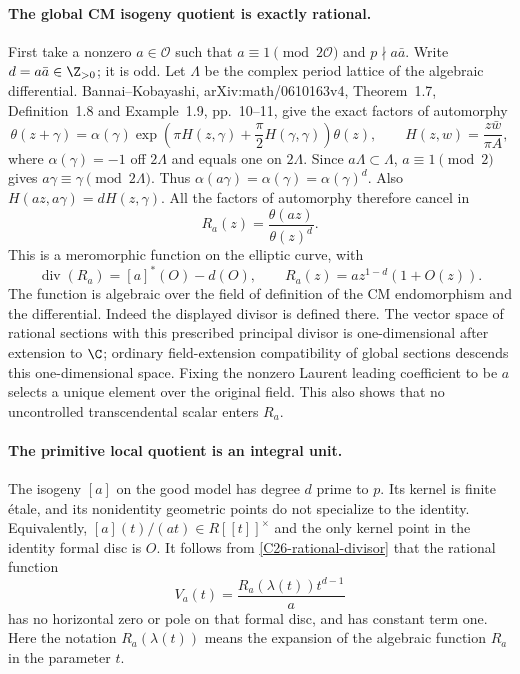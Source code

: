 \paragraph{The global CM isogeny quotient is exactly rational.}
First take a nonzero $a\in\mathcal O$ such that
$a\equiv1\pmod{2\mathcal O}$ and $p\nmid a\bar a$.
Write $d=a\bar a\in\Z_{>0}$; it is odd.
Let $\Lambda$ be the complex period lattice of the algebraic
differential.  Bannai--Kobayashi, arXiv:math/0610163v4,
Theorem~1.7, Definition~1.8 and Example~1.9, pp.~10--11,
give the exact factors of automorphy
\[
 \theta(z+\gamma)
 =\alpha(\gamma)
   \exp\!\left(\pi H(z,\gamma)+\frac\pi2H(\gamma,\gamma)\right)
   \theta(z),\qquad
 H(z,w)=\frac{z\bar w}{\pi A},
\]
where $\alpha(\gamma)=-1$ off $2\Lambda$ and equals one on
$2\Lambda$.  Since $a\Lambda\subset\Lambda$,
$a\equiv1\pmod2$ gives $a\gamma\equiv\gamma\pmod{2\Lambda}$.
Thus $\alpha(a\gamma)=\alpha(\gamma)=\alpha(\gamma)^d$.
Also $H(az,a\gamma)=dH(z,\gamma)$.
All the factors of automorphy therefore cancel in
\[
                 R_a(z)=\frac{\theta(az)}{\theta(z)^d}.
\]
This is a meromorphic function on the elliptic curve, with
\begin{equation}\label{C26-rational-divisor}
       \operatorname{div}(R_a)=[a]^*(O)-d(O),
       \qquad R_a(z)=a z^{1-d}(1+O(z)).
\end{equation}
The function is algebraic over the field of definition of the
CM endomorphism and the differential.  Indeed the displayed
divisor is defined there.  The vector space of rational sections
with this prescribed principal divisor is one-dimensional after
extension to $\C$; ordinary field-extension compatibility of
global sections descends this one-dimensional space.  Fixing the
nonzero Laurent leading coefficient to be $a$ selects a unique
element over the original field.  This also shows that no
uncontrolled transcendental scalar enters $R_a$.

\paragraph{The primitive local quotient is an integral unit.}
The isogeny $[a]$ on the good model has degree $d$ prime to $p$.
Its kernel is finite \'etale, and its nonidentity geometric
points do not specialize to the identity.  Equivalently,
$[a](t)/(a t)\in R[[t]]^{\times}$ and the only kernel point
in the identity formal disc is $O$.
It follows from \eqref{C26-rational-divisor} that the rational
function
\[
              V_a(t)=\frac{R_a(\lambda(t))t^{d-1}}a
\]
has no horizontal zero or pole on that formal disc, and has
constant term one.  Here the notation $R_a(\lambda(t))$ means
the expansion of the algebraic function $R_a$ in the parameter
$t$.


